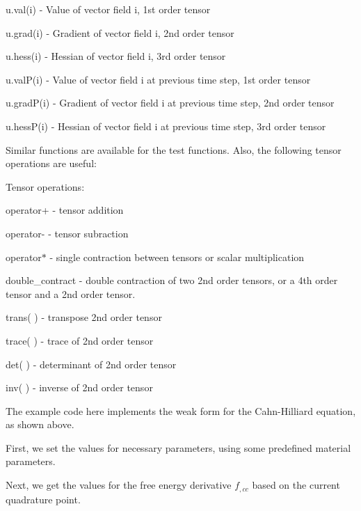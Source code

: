 {\ttfamily u.\-val(i)} -\/ Value of vector field i, 1st order tensor \par
{\ttfamily u.\-grad(i)} -\/ Gradient of vector field i, 2nd order tensor \par
{\ttfamily u.\-hess(i)} -\/ Hessian of vector field i, 3rd order tensor \par
{\ttfamily u.\-val\-P(i)} -\/ Value of vector field i at previous time step, 1st order tensor \par
{\ttfamily u.\-grad\-P(i)} -\/ Gradient of vector field i at previous time step, 2nd order tensor \par
{\ttfamily u.\-hess\-P(i)} -\/ Hessian of vector field i at previous time step, 3rd order tensor

Similar functions are available for the test functions. Also, the following tensor operations are useful\-:

Tensor operations\-: \par
{\ttfamily operator+} -\/ tensor addition \par
{\ttfamily operator-\/} -\/ tensor subraction \par
{\ttfamily operator$\ast$} -\/ single contraction between tensors or scalar multiplication \par
{\ttfamily double\-\_\-contract} -\/ double contraction of two 2nd order tensors, or a 4th order tensor and a 2nd order tensor. \par
{\ttfamily trans( )} -\/ transpose 2nd order tensor \par
{\ttfamily trace( )} -\/ trace of 2nd order tensor \par
{\ttfamily det( )} -\/ determinant of 2nd order tensor \par
{\ttfamily inv( )} -\/ inverse of 2nd order tensor \par
 The example code here implements the weak form for the Cahn-\/\-Hilliard equation, as shown above.

First, we set the values for necessary parameters, using some predefined material parameters.


\begin{DoxyCodeInclude}

\end{DoxyCodeInclude}


Next, we get the values for the free energy derivative $f_{,cc}$ based on the current quadrature point.


\begin{DoxyCodeInclude}

\end{DoxyCodeInclude}


